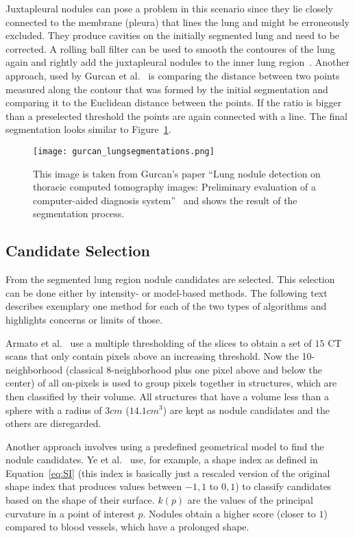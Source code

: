 \documentclass[main.tex]{subfiles}
\begin{document}
Juxtapleural nodules can pose a problem in this scenario since they lie closely connected to the membrane (pleura) that lines the lung and might be erroneously excluded. They produce cavities on the initially segmented lung and need to be corrected. A rolling ball filter can be used to smooth the contoures of the lung again and rightly add the juxtapleural nodules to the inner lung region~\cite{armato1999computerized}. Another approach, used by Gurcan et al.~\cite{gurcan2002lung} is comparing the distance between two points measured along the contour that was formed by the initial segmentation and comparing it to the Euclidean distance between the points. If the ratio is bigger than a preselected threshold the points are again connected with a line. The final segmentation looks similar to Figure~\ref{fig:segmentation}.

\begin{figure}[ht]
\centering
\texttt{[image: gurcan\_lungsegmentations.png]}
\caption{This image is taken from Gurcan's paper ``Lung nodule detection on thoracic computed tomography images: Preliminary evaluation of a computer-aided diagnosis system''~\cite{gurcan2002lung} and shows the result of the segmentation process.}
\label{fig:segmentation}
\end{figure}


\subsection{Candidate Selection}
From the segmented lung region nodule candidates are selected. This selection can be done either by intensity- or model-based methods. The following text describes exemplary one method for each of the two types of algorithms and highlights concerns or limits of those. 

Armato et al.~\cite{armato1999computerized} use a multiple thresholding of the slices to obtain a set of $15$ CT scans that only contain pixels above an increasing threshold. Now the 10-neighborhood (classical 8-neighborhood plus one pixel above and below the center) of all on-pixels is used to group pixels together in structures, which are then classified by their volume. All structures that have a volume less than a sphere with a radius of $3 cm$ ($14.1cm^3$) are kept as nodule candidates and the others are disregarded.

Another approach involves using a predefined geometrical model to find the nodule candidates. Ye et al.~\cite{ye2009shape} use, for example, a shape index as defined in Equation~\ref{eq:SI} (this index is basically just a rescaled version of the original shape index that produces values between $-1,1$ to $0,1$) to classify candidates based on the shape of their surface. $k(p)$ are the values of the principal curvature in a point of interest $p$. Nodules obtain a higher score (closer to $1$) compared to blood vessels, which have a prolonged shape. 
\end{document}
